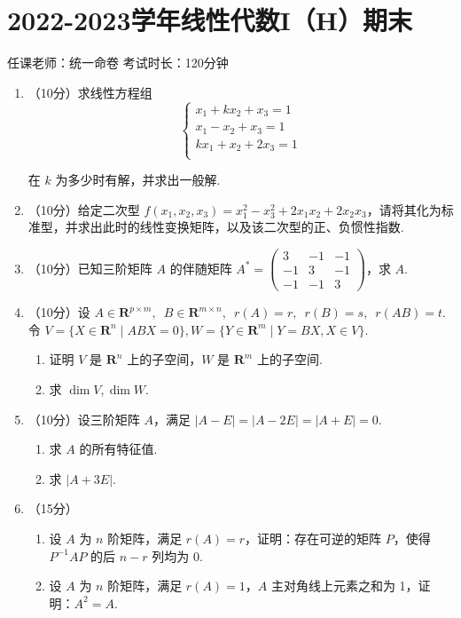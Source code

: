\section{2022-2023学年线性代数I（H）期末}

\begin{center}
    任课老师：统一命卷\hspace{4em} 考试时长：120分钟
\end{center}

\begin{enumerate}
    \item （10分）求线性方程组
	\[\begin{cases}
	  x_1+kx_2+x_3= 1\\
	  x_1-x_2+x_3= 1 \\
	  kx_1+x_2+2x_3= 1 \\
	\end{cases}\]

	在 $k$ 为多少时有解，并求出一般解.
	\item （10分）给定二次型 $f(x_1,x_2,x_3)=x_1^2-x_3^2+2x_1x_2+2x_2x_3$，请将其化为标准型，并求出此时的线性变换矩阵，以及该二次型的正、负惯性指数.
	\item （10分）已知三阶矩阵 $A$ 的伴随矩阵 $A^*=\begin{pmatrix}
		3 & -1 &- 1\\
		-1 & 3 & -1\\
		-1 & -1 & 3
	  \end{pmatrix} $，求 $A$.
	\item （10分）设 $A\in \mathbf R^{p\times m},\enspace B\in \mathbf R^{m\times n},\enspace r(A)=r,\enspace r(B)=s,\enspace r(AB)=t$. 令 $V=\{X\in \mathbf R^n\mid ABX=0\},W=\{Y\in \mathbf R^m\mid Y=BX,X\in V\}$.
      \begin{enumerate}
        \item 证明 $V$ 是 $\mathbf R^n$ 上的子空间，$W$ 是 $\mathbf R^m$ 上的子空间.
        \item 求 $\dim V,\dim W$.
      \end{enumerate}

	\item （10分）设三阶矩阵 $A$，满足 $|A-E|=|A-2E|=|A+E|=0$.
      \begin{enumerate}
        \item 求 $A$ 的所有特征值.
        \item 求 $|A+3E|$.
      \end{enumerate}

	\item （15分）
      \begin{enumerate}
        \item 设 $A$ 为 $n$ 阶矩阵，满足 $r(A)=r$，证明：存在可逆的矩阵 $P$，使得 $P^{-1}AP$ 的后 $n-r$ 列均为 0.
        \item 设 $A$ 为 $n$ 阶矩阵，满足 $r(A)=1$，$A$ 主对角线上元素之和为 1，证明：$A^2=A$.
      \end{enumerate}


\end{enumerate}

